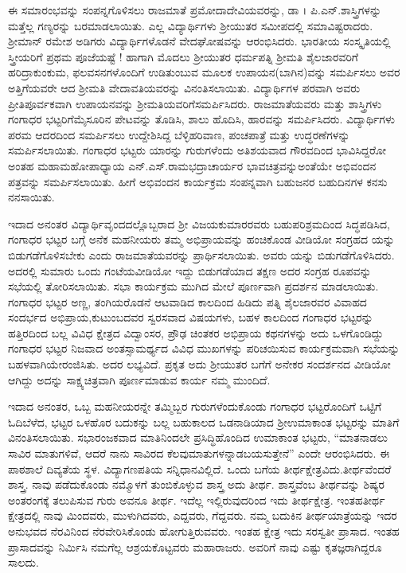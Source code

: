 {ಈ ಸಮಾರಂಭವನ್ನು ಸಂಪನ್ನಗೊಳಿಸಲು ರಾಜಮಾತೆ ಪ್ರಮೋದಾದೇವಿಯವ\-ರನ್ನು, ಡಾ । ಪಿ.ಎನ್.ಶಾಸ್ತ್ರಿಗಳನ್ನು ಮತ್ತೆಲ್ಲ ಗಣ್ಯರನ್ನು ಬರಮಾಡಲಾಯಿತು. ಎಲ್ಲ ವಿದ್ಯಾರ್ಥಿಗಳು ಶ್ರೀಯುತರ ಸಮೀಪದಲ್ಲಿ ಸಮಾವಿಷ್ಟರಾದರು. ಶ್ರೀಮಾನ್ ರಮೇಶ ಅಡಿಗರು ವಿದ್ಯಾರ್ಥಿಗಳೊಡನೆ ವೇದಘೋಷವನ್ನು ಆರಂಭಿಸಿದರು. ಭಾರತೀಯ \hbox{ಸಂಸ್ಕೃತಿಯಲ್ಲಿ} ಸ್ತ್ರೀಯರಿಗೆ ಪ್ರಥಮ ಪೂಜೆಯಷ್ಟೆ ! ಹಾಗಾಗಿ ಮೊದಲು ಶ್ರೀಯುತರ ಧರ್ಮಪತ್ನಿ ಶ್ರೀಮತಿ ಶೈಲಜಾರವರಿಗೆ  ಹರಿದ್ರಾಕುಂಕುಮ, ಫಲವಸನಗಳೊಂದಿಗೆ ಉಡಿತುಂಬುವ ಮೂಲಕ ಉಪಾಯನ(ಬಾಗಿನ)ವನ್ನು ಸಮರ್ಪಿಸಲು ಅವರ ಅತ್ತಿಗೆಯವರೇ ಆದ  ಶ್ರೀಮತಿ ವೇದಾವತಿಯವರನ್ನು ವಿನಂತಿಸಲಾಯಿತು. ವಿದ್ಯಾರ್ಥಿಗಳ ಪರವಾಗಿ ಅವರು ಪ್ರೀತಿಪೂರ್ವಕವಾಗಿ ಉಪಾಯನವನ್ನು ಶ್ರೀಮತಿಯವರಿಗೆ\break ಸಮರ್ಪಿಸಿದರು. ರಾಜಮಾತೆಯವರು ಮತ್ತು ಶಾಸ್ತ್ರಿಗಳು ಗಂಗಾಧರ ಭಟ್ಟರಿಗೆ\break ಮೈಸೂರಿನ ಪೇಟವನ್ನು ತೊಡಿಸಿ, ಶಾಲು ಹೊದಿಸಿ, ಹಾರವನ್ನು \hbox{ಸಮರ್ಪಿಸಿದರು}. ವಿದ್ಯಾರ್ಥಿಗಳು ಪರಮ ಆದರದಿಂದ ಸಮರ್ಪಿಸಲು ಉದ್ದೇಶಿಸಿದ್ದ ಬೆಳ್ಳಿಹರಿವಾಣ, ಪಂಚಪಾತ್ರೆ ಮತ್ತು ಉದ್ಧರಣೆಗಳನ್ನು ಸಮರ್ಪಿಸಲಾಯಿತು. ಗಂಗಾಧರ ಭಟ್ಟರು ಯಾರನ್ನು ಗುರುಗಳೆಂದು ಅತಿಶಯವಾದ ಗೌರವದಿಂದ ಭಾವಿಸಿದ್ದರೋ ಅಂತಹ ಮಹಾಮಹೋಪಾಧ್ಯಾಯ ಎನ್.ಎಸ್.ರಾಮಭದ್ರಾಚಾರ್ಯರ ಭಾವಚಿತ್ರವನ್ನು\break ಅಂತೆಯೇ ಅಭಿವಂದನ ಪತ್ರವನ್ನು ಸಮರ್ಪಿಸಲಾಯಿತು. ಹೀಗೆ ಅಭಿವಂದನ ಕಾರ್ಯಕ್ರಮ ಸಂಪನ್ನವಾಗಿ ಬಹುಜನರ ಬಹುದಿನಗಳ  ಕನಸು ನನಸಾಯಿತು. 
\vskip 8pt

ಇದಾದ ಅನಂತರ ವಿದ್ಯಾರ್ಥಿವೃಂದದಲ್ಲೊಬ್ಬರಾದ ಶ್ರೀ ವಿಜಯಕುಮಾರರವರು ಬಹುಪರಿಶ್ರಮದಿಂದ ಸಿದ್ಧಪಡಿಸಿದ, ಗಂಗಾಧರ ಭಟ್ಟರ ಬಗ್ಗೆ ಅನೆಕ ಮಹನೀಯರು ತಮ್ಮ ಅಭಿಪ್ರಾಯವನ್ನು ಹಂಚಿಕೊಂಡ ವೀಡಿಯೋ ಸಂಗ್ರಹದ  ಯನ್ನು ಬಿಡುಗಡೆ\-ಗೊಳಿಸಬೇಕು ಎಂದು ರಾಜಮಾತೆಯವರನ್ನು ಪ್ರಾರ್ಥಿಸಲಾಯಿತು. ಅವರು  ಯನ್ನು ಬಿಡುಗಡೆಗೊಳಿಸಿದರು. ಅದರಲ್ಲಿ ಸುಮಾರು ಒಂದು ಗಂಟೆಯ\break ವೀಡಿಯೋ ಇದ್ದು ಬಿಡುಗಡೆಯಾದ ತಕ್ಷಣ ಅದರ ಸಂಗ್ರಹ ರೂಪವನ್ನು ಸಭೆಯಲ್ಲಿ ತೋರಿಸಲಾಯಿತು. ಸಭಾ ಕಾರ್ಯಕ್ರಮ ಮುಗಿದ ಮೇಲೆ ಪೂರ್ಣವಾಗಿ ಪ್ರದರ್ಶನ ಮಾಡಲಾಯಿತು. ಗಂಗಾಧರ ಭಟ್ಟರ ಅಣ್ಣ, ತಂಗಿಯರೊಡನೆ ಆಟವಾಡಿದ ಕಾಲದಿಂದ ಹಿಡಿದು ಪತ್ನಿ \enginline{-} ಶೈಲಜಾರವರ ವಿವಾಹದ ಸಂದರ್ಭದ ಅಭಿಪ್ರಾಯ,\break ಕುಟುಂಬದವರ ಸ್ವರಸವಾದ ವಿಷಯಗಳು, ಬಹಳ ಕಾಲದಿಂದ ಗಂಗಾಧರ ಭಟ್ಟರನ್ನು ಹತ್ತಿರದಿಂದ ಬಲ್ಲ ವಿವಿಧ ಕ್ಷೇತ್ರದ ವಿದ್ವಾಂಸರ, ಪ್ರೌಢ ಚಿಂತಕರ ಅಭಿಪ್ರಾಯ ಕಥನ\-ಗಳನ್ನು ಅದು ಒಳಗೊಂಡಿದ್ದು ಗಂಗಾಧರ ಭಟ್ಟರ ನಿಜವಾದ ಅಂತಸ್ಸಾಮರ್ಥ್ಯದ ವಿವಿಧ ಮುಖಗಳನ್ನು ಪರಿಚಯಿಸುವ ಕಾರ್ಯಕ್ರಮವಾಗಿ ಸಭೆಯನ್ನು ಬಹಳವಾಗಿಯೇ\break  ರಂಜಿಸಿತು. ಅದರ  ಲಭ್ಯವಿದೆ. ಪ್ರಕೃತ ಅದು ಶ್ರೀಯುತರ ಬಗೆಗೆ ಅನೇಕರ \hbox{ಸಂದರ್ಶನದ} ವೀಡಿಯೋ ಆಗಿದ್ದು ಅದನ್ನು ಸಾಕ್ಷ್ಯಚಿತ್ರವಾಗಿ ಪೂರ್ಣಮಾಡುವ ಕಾರ್ಯ ನಮ್ಮ ಮುಂದಿದೆ. 

ಇದಾದ ಅನಂತರ, ಒಬ್ಬ ಮಹನೀಯರನ್ನೇ ತಮ್ಮಿಬ್ಬರ ಗುರುಗಳೆಂದು\-ಕೊಂಡು ಗಂಗಾಧರ ಭಟ್ಟರೊಂದಿಗೆ ಒಟ್ಟಿಗೆ ಓದಿ\enginline{-}ಬೆಳೆದ, ಭಟ್ಟರ ಒಳಹೊರ ಬದುಕನ್ನು ಬಲ್ಲ ಬಹುಕಾಲದ ಒಡನಾಡಿಯಾದ ಶ್ರೀಉಮಾಕಾಂತ ಭಟ್ಟರನ್ನು ಮಾತಿಗೆ ವಿನಂತಿಸ\-ಲಾಯಿತು. ಸಭಾರಂಜಕವಾದ ಮಾತಿನಿಂದಲೇ ಪ್ರಸಿದ್ಧಿಹೊಂದಿದ ಉಮಾಕಾಂತ ಭಟ್ಟರು, “ಮಾತನಾಡಲು ಸಾವಿರ ಮಾತುಗಳಿವೆ, ಆದರೆ ನಾನು ಸಾವಿರದ ಕೆಲವು\break ಮಾತುಗಳನ್ನಾಡಬಯಸುತ್ತೇನೆ” ಎಂದೇ ಆರಂಭಿಸಿದರು. ಈ ಪಾಠಶಾಲೆ ದಿವ್ಯತೆಯ ಸ್ಥಳ. ವಿದ್ಯಾಗಣಪತಿಯ ಸನ್ನಿಧಾನವಿಲ್ಲಿದೆ. ಒಂದು ಬಗೆಯ ತೀರ್ಥಕ್ಷೇತ್ರವಿದು.\break ತೀರ್ಥವೆಂದರೆ ಶಾಸ್ತ್ರ. ನಾವು ಪಡೆದುಕೊಂಡು ನಮ್ಮೊಳಗೆ ತುಂಬಿಕೊಳ್ಳುವ ಶಾಸ್ತ್ರ \enginline{-} ಅದು ತೀರ್ಥ. ಶಾಸ್ತ್ರವೆಂಬ ತೀರ್ಥವನ್ನು ಶಿಷ್ಯರ ಅಂತರಂಗಕ್ಕೆ ತಲುಪಿಸುವ ಗುರು \enginline{-} ಅವನೂ ತೀರ್ಥ. ಇದೆಲ್ಲ ಇಲ್ಲಿರುವುದರಿಂದ ಇದು ತೀರ್ಥಕ್ಷೇತ್ರ. ಇಂತಹ\break ತೀರ್ಥ ಕ್ಷೇತ್ರದಲ್ಲಿ ನಾವು ಮಿಂದವರು, ಮುಳುಗಿದವರು, ಎದ್ದವರು, ಗೆದ್ದವರು. ನಮ್ಮ ಬದುಕಿನ ತೀರ್ಥ\-ಯಾತ್ರೆಯನ್ನು ಇದರ ಅನುಭವದ ನೆರವಿನಿಂದ ನೆರವೇರಿಸಿಕೊಂಡು ಹೋಗುತ್ತಿರು\-ವವರು. ಇಂತಹ ಕ್ಷೇತ್ರ \enginline{-}  ಇದು ಸರಸ್ವತೀ ಪ್ರಾಸಾದ. ಇಂತಹ ಪ್ರಾಸಾದವನ್ನು ನಿರ್ಮಿಸಿ ನಮಗೆಲ್ಲ ಆಶ್ರಯಕೊಟ್ಟವರು ಮಹಾರಾಜರು. ಅವರಿಗೆ ನಾವು ಎಷ್ಟು ಕೃತಜ್ಞ\-ರಾಗಿದ್ದರೂ ಸಾಲದು.

}
